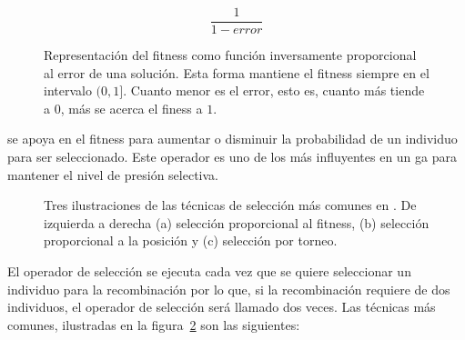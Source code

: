 \begin{equation}
	\frac{1}{1 - error}
	\label{eq:fitness-as-error-inverse}
\end{equation}

\begin{figure}
	\caption{Representación del fitness como función inversamente proporcional al error de una solución. Esta forma mantiene el fitness siempre en el intervalo $(0, 1]$. Cuanto menor es el error, esto es, cuanto más tiende a $0$, más se acerca el finess a $1$.}
	\label{fig:fitness-via-error}
\end{figure}


 se apoya en el fitness para aumentar o disminuir la probabilidad de un individuo para ser seleccionado. Este operador es uno de los más influyentes en un \gls{ga} para mantener el nivel de presión selectiva.

\begin{figure}
	\caption{Tres ilustraciones de las técnicas de selección más comunes en . De izquierda a derecha (a) selección proporcional al fitness, (b) selección proporcional a la posición y (c) selección por torneo.}
	\label{fig:selection-techniques}
\end{figure}

El operador de selección se ejecuta cada vez que se quiere seleccionar un individuo para la recombinación por lo que, si la recombinación requiere de dos individuos, el operador de selección será llamado dos veces. Las técnicas más comunes, ilustradas en la figura~\ref{fig:selection-techniques} son las siguientes:


